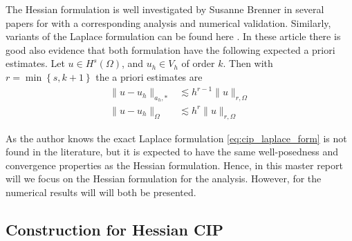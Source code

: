 The Hessian formulation is well investigated by Susanne Brenner in several papers for \cite{brenner2012, brenner2012quadratic, brenner2012quadratic_kirk} with a corresponding analysis and numerical validation. Similarly, variants of the Laplace formulation can be found here
\cite{feng2007fully, georgoulis2009discontinuous}. In these article there is good also evidence  that both formulation have the following expected a priori estimates. Let  $u \in H^{s}( \Omega ) $, and $u_{h}\in  V_{h}  $ of order $k$. Then with $r = \min\left\{ s,
k+1 \right\}$ the a priori estimates are   \[
    \begin{split}
\| u - u_{h} \|_{ a_{h},*  }^{  }  & \lesssim  h^{r-1} \| u \|_{ r, \Omega  }^{  } \\
\| u - u_{h} \|_{ \Omega   }^{  }  & \lesssim  h^{r} \| u \|_{ r,\Omega  }^{  }
    \end{split}
\]

\begin{remark}

As the author knows the exact Laplace formulation \eqref{eq:cip_laplace_form} is not found in the literature, but it is expected to have the same well-posedness and convergence properties as the
Hessian formulation. Hence, in this master report will we focus on the Hessian formulation for the analysis. However, for the numerical results will will both be presented.
\end{remark}



\subsection{  Construction for Hessian CIP}%
\label{sub:continious_weak_form_of_biharmonic_equation}

